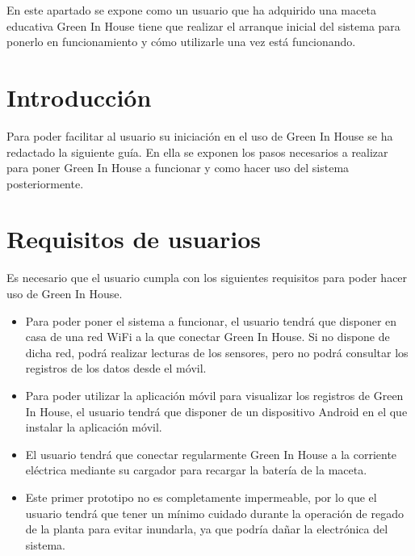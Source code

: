 En este apartado se expone como un usuario que ha adquirido una maceta educativa Green In House tiene que realizar el arranque inicial del sistema para ponerlo en funcionamiento y cómo utilizarle una vez está funcionando.

\section{Introducción}
Para poder facilitar al usuario su iniciación en el uso de Green In House se ha redactado la siguiente guía. En ella se exponen los pasos necesarios a realizar para poner Green In House a funcionar y como hacer uso del sistema posteriormente.

\section{Requisitos de usuarios}
Es necesario que el usuario cumpla con los siguientes requisitos para poder hacer uso de Green In House.
\begin{itemize}
    \item Para poder poner el sistema a funcionar, el usuario tendrá que disponer en casa de una red WiFi a la que conectar Green In House. Si no dispone de dicha red, podrá realizar lecturas de los sensores, pero no podrá consultar los registros de los datos desde el móvil.
    \item Para poder utilizar la aplicación móvil para visualizar los registros de Green In House, el usuario tendrá que disponer de un dispositivo Android en el que instalar la aplicación móvil.
    \item El usuario tendrá que conectar regularmente Green In House a la corriente eléctrica mediante su cargador para recargar la batería de la maceta.
    \item Este primer prototipo no es completamente impermeable, por lo que el usuario tendrá que tener un mínimo cuidado durante la operación de regado de la planta para evitar inundarla, ya que podría dañar la electrónica del sistema. 
\end{itemize}


